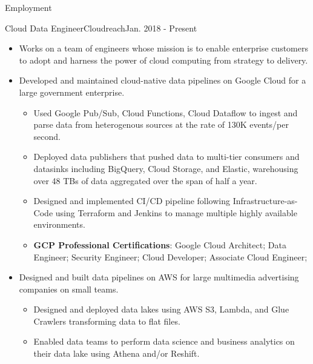 \documentclass[]{mcdowellcv}
\begin{document}
    \makeheader

    \begin{cvsection}{Employment}


        \begin{cvsubsection}{Cloud Data Engineer}{Cloudreach}{Jan. 2018 - Present}
            \begin{itemize}
                \item Works on a team of engineers whose mission is to enable enterprise customers to adopt and harness the power of cloud computing from strategy to delivery. 
                \item Developed and maintained cloud-native data pipelines on Google Cloud for a large government enterprise.
                    \begin{itemize}
                            \item Used Google Pub/Sub, Cloud Functions, Cloud Dataflow to ingest and parse data from heterogenous sources at the rate of 130K events/per second. 
                            \item Deployed data publishers that pushed data to multi-tier consumers and datasinks including BigQuery, Cloud Storage, and Elastic, warehousing over 48 TBs of data aggregated over the span of half a year. 
                            \item Designed and implemented CI/CD pipeline following Infrastructure-as-Code using Terraform and Jenkins to manage multiple highly available environments. 
                            \item \textbf{GCP Professional Certifications}: Google Cloud Architect; Data Engineer; \newline Security Engineer; Cloud Developer; Associate Cloud Engineer;
                    \end{itemize}
                \end{itemize}
                \begin{itemize}
                    \item Designed and built data pipelines on AWS for large multimedia advertising companies on small teams.
                    \begin{itemize}
                        \item Designed and deployed data lakes using AWS S3, Lambda, and Glue Crawlers transforming data to flat files. 
                        \item Enabled data teams to perform data science and business analytics on their data lake using Athena and/or Reshift.

\end{itemize}
\end{itemize}
\end{cvsubsection}
\end{cvsection}
\end{document}
